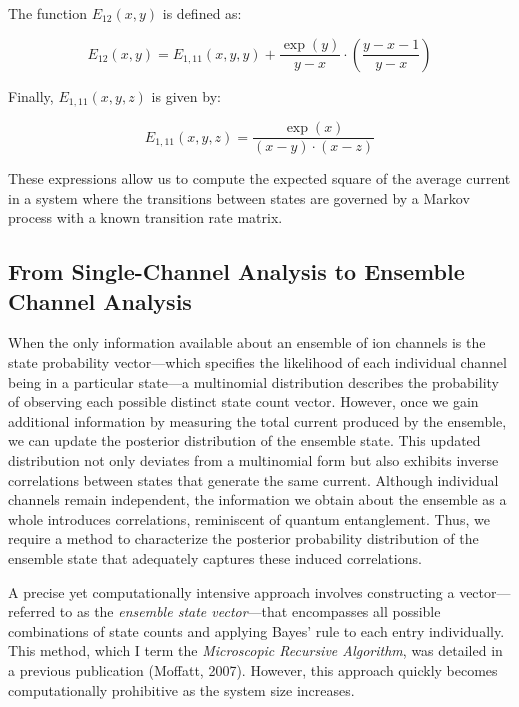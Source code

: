 \documentclass[pdflatex,sn-mathphys-num]{sn-jnl}%
\theoremstyle{thmstyleone}%
\theoremstyle{thmstyletwo}%
\theoremstyle{thmstylethree}%
\begin{document}
The function \(E_{12}(x, y)\) is defined as:

\begin{equation}
	E_{12}(x,y) = E_{1,11}(x, y, y) + \frac{\exp(y)}{y - x} \cdot \left(\frac{y - x - 1}{y - x}\right)
	\label{eq:E_12}
\end{equation}

Finally, \(E_{1,11}(x, y, z)\) is given by:

\begin{equation}
	E_{1,11}(x, y, z) = \frac{\exp(x)}{(x - y) \cdot (x - z)}
	\label{eq:E_1_11}
\end{equation}

These expressions allow us to compute the expected square of the average current in a system where the transitions between states are governed by a Markov process with a known transition rate matrix.






\subsection{From Single-Channel Analysis to Ensemble Channel Analysis}

When the only information available about an ensemble of ion channels is the state probability vector—which specifies the likelihood of each individual channel being in a particular state—a multinomial distribution describes the probability of observing each possible distinct state count vector. However, once we gain additional information by measuring the total current produced by the ensemble, we can update the posterior distribution of the ensemble state. This updated distribution not only deviates from a multinomial form but also exhibits inverse correlations between states that generate the same current. Although individual channels remain independent, the information we obtain about the ensemble as a whole introduces correlations, reminiscent of quantum entanglement. Thus, we require a method to characterize the posterior probability distribution of the ensemble state that adequately captures these induced correlations.

A precise yet computationally intensive approach involves constructing a vector—referred to as the \textit{ensemble state vector}—that encompasses all possible combinations of state counts and applying Bayes' rule to each entry individually. This method, which I term the \textit{Microscopic Recursive Algorithm}, was detailed in a previous publication (Moffatt, 2007). However, this approach quickly becomes computationally prohibitive as the system size increases.
\end{document}
